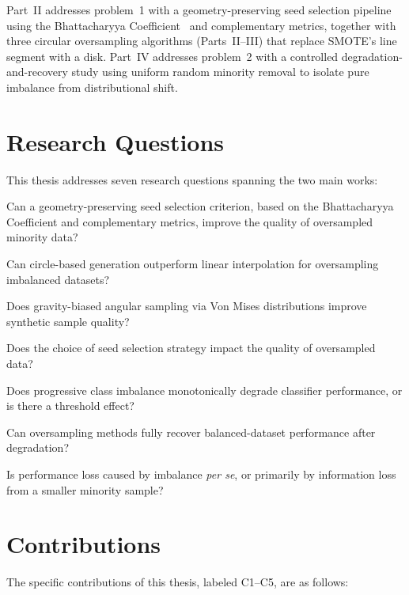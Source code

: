Part~II addresses problem~1 with a geometry-preserving seed selection pipeline using the Bhattacharyya Coefficient~\cite{bhattacharyya1943measure} and complementary metrics, together with three circular oversampling algorithms (Parts~II--III) that replace SMOTE's line segment with a disk.
Part~IV addresses problem~2 with a controlled degradation-and-recovery study using uniform random minority removal to isolate pure imbalance from distributional shift.

\section{Research Questions}
\label{sec:intro:rqs}

This thesis addresses seven research questions spanning the two main works:

\begin{description}[leftmargin=!, labelwidth=\widthof{\textbf{RQ7:}}]
  \item[\textbf{RQ1}] Can a geometry-preserving seed selection criterion, based on the Bhattacharyya Coefficient and complementary metrics, improve the quality of oversampled minority data?
  \item[\textbf{RQ2}] Can circle-based generation outperform linear interpolation for oversampling imbalanced datasets?
  \item[\textbf{RQ3}] Does gravity-biased angular sampling via Von Mises distributions improve synthetic sample quality?
  \item[\textbf{RQ4}] Does the choice of seed selection strategy impact the quality of oversampled data?
  \item[\textbf{RQ5}] Does progressive class imbalance monotonically degrade classifier performance, or is there a threshold effect?
  \item[\textbf{RQ6}] Can oversampling methods fully recover balanced-dataset performance after degradation?
  \item[\textbf{RQ7}] Is performance loss caused by imbalance \emph{per se}, or primarily by information loss from a smaller minority sample?
\end{description}

\section{Contributions}
\label{sec:intro:contributions}

The specific contributions of this thesis, labeled C1--C5, are as follows:

